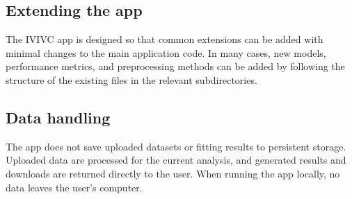 \subsection{Extending the app}

The IVIVC app is designed so that common extensions can be added with minimal changes to the main application code. In many cases, new models, performance metrics, and preprocessing methods can be added by following the structure of the existing files in the relevant subdirectories.

\subsection{Data handling}

The app does not save uploaded datasets or fitting results to persistent storage. Uploaded data are processed for the current analysis, and generated results and downloads are returned directly to the user. When running the app locally, no data leaves the user's computer.

